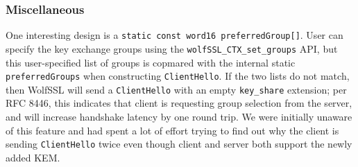 \documentclass[letterpaper,12pt,titlepage,oneside,final]{book}
\begin{document}

\subsubsection{Miscellaneous} One interesting design is a \texttt{static const word16 preferredGroup[]}.
User can specify the key exchange groups using the \texttt{wolfSSL\_CTX\_set\_groups} API, but this user-specified list of groups is copmared with the internal static \texttt{preferredGroups} when constructing \texttt{ClientHello}.
If the two lists do not match, then WolfSSL will send a \texttt{ClientHello} with an empty \texttt{key\_share} extension; per RFC 8446, this indicates that client is requesting group selection from the server, and will increase handshake latency by one round trip.
We were initially unaware of this feature and had spent a lot of effort trying to find out why the client is sending \texttt{ClientHello} twice even though client and server both support the newly added KEM.
\end{document}
